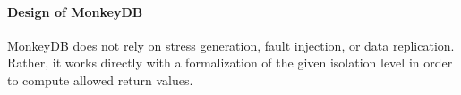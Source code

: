 \paragraph{Design of MonkeyDB}
MonkeyDB does not rely on stress generation, fault
injection, or data replication. 
Rather, it works directly with a formalization of
the given isolation level in order to compute allowed return values. 





